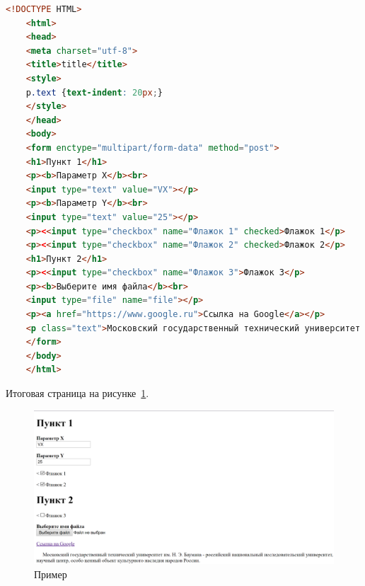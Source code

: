 \begin{lstlisting}[frame=single, label={rndhpcgui.2023.02.28.HTML}, caption={Пример выходных данных}, language={HTML}] 
	<!DOCTYPE HTML>
	<html>
	<head>
	<meta charset="utf-8">
	<title>title</title>
	<style>
	p.text {text-indent: 20px;}
	</style>
	</head>
	<body>
	<form enctype="multipart/form-data" method="post">
	<h1>Пункт 1</h1>
	<p><b>Параметр X</b><br>
	<input type="text" value="VX"></p>
	<p><b>Параметр Y</b><br>
	<input type="text" value="25"></p>
	<p><<input type="checkbox" name="Флажок 1" checked>Флажок 1</p>
	<p><<input type="checkbox" name="Флажок 2" checked>Флажок 2</p>
	<h1>Пункт 2</h1>
	<p><<input type="checkbox" name="Флажок 3">Флажок 3</p>
	<p><b>Выберите имя файла</b><br>
	<input type="file" name="file"></p>
	<p><a href="https://www.google.ru">Ссылка на Google</a></p>
	<p class="text">Московский государственный технический университет им. Н. Э. Баумана - российский национальный исследовательский университет, научный центр, особо ценный объект культурного наследия народов России.</p>
	</form>
	</body>
	</html>
\end{lstlisting}


Итоговая страница на рисунке~\ref{rndhpcgui.2023.02.28.picture1}.


\begin{figure}[!ht]
  \centering
  \includegraphics[scale=0.4]{ResearchNotes/rndhpc_dev_gui_2023_02_28/rndhpcgui.2023.02.28.picture1.png}
  \caption{Пример}
  \label{rndhpcgui.2023.02.28.picture1}
\end{figure}

\noteattributes{}

